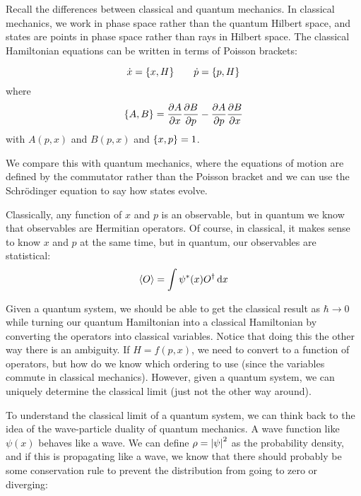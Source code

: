 \documentclass[a4paper,twoside,master.tex]{subfiles}
\begin{document}

Recall the differences between classical and quantum mechanics. In classical mechanics, we work in phase space rather than the quantum Hilbert space, and states are points in phase space rather than rays in Hilbert space. The classical Hamiltonian equations can be written in terms of Poisson brackets:

\begin{equation}
    \dot{x} = \pb{x}{H} \qquad \dot{p} = \pb{p}{H}
\end{equation}
where
\begin{equation}
    \pb{A}{B} = \pdv{A}{x} \pdv{B}{p} - \pdv{A}{p} \pdv{B}{x}
\end{equation}
with $ A(p,x) $ and $ B(p,x) $ and $ \pb{x}{p} = 1 $.

We compare this with quantum mechanics, where the equations of motion are defined by the commutator rather than the Poisson bracket and we can use the Schr\"odinger equation to say how states evolve.

Classically, any function of $ x $ and $ p $ is an observable, but in quantum we know that observables are Hermitian operators. Of course, in classical, it makes sense to know $ x $ and $ p $ at the same time, but in quantum, our observables are statistical:
\begin{equation}
    \ev{O} = \int \psi^*(x) O^\dagger \dd{x}
\end{equation}

Given a quantum system, we should be able to get the classical result as $ \hbar \to 0 $ while turning our quantum Hamiltonian into a classical Hamiltonian by converting the operators into classical variables. Notice that doing this the other way there is an ambiguity. If $ H = f(p,x) $, we need to convert to a function of operators, but how do we know which ordering to use (since the variables commute in classical mechanics). However, given a quantum system, we can uniquely determine the classical limit (just not the other way around).


To understand the classical limit of a quantum system, we can think back to the idea of the wave-particle duality of quantum mechanics. A wave function like $ \psi(x) $ behaves like a wave. We can define $ \rho = \abs{\psi}^2 $ as the probability density, and if this is propagating like a wave, we know that there should probably be some conservation rule to prevent the distribution from going to zero or diverging:
\end{document}
